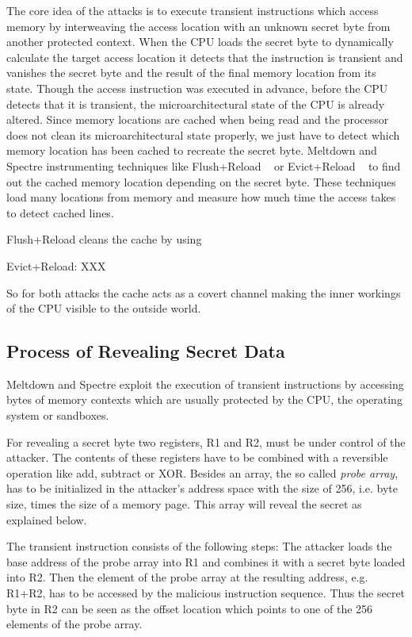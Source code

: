 \documentclass[a4paper,oneside,openright] {scrreprt}
\begin{document}
The core idea of the attacks is to execute transient instructions 
which access memory by interweaving the access location with an unknown secret byte from another protected context. 
When the CPU loads the secret byte to dynamically calculate the target access location 
it detects that the instruction is transient and vanishes the secret byte and the result of the final memory location from its state. 
Though the access instruction was executed in advance, before the CPU detects that it is transient, the microarchitectural state
 of the CPU is already altered.
 Since memory locations are cached when being read and the processor does not clean its microarchitectural state properly,
 we just have to detect which memory location has been cached to recreate the secret byte.
 Meltdown and Spectre instrumenting techniques like Flush+Reload ~\cite{yarom2014flush} 
 or Evict+Reload ~\cite{gruss2015cache} to find out the cached memory location depending on the secret byte.
These techniques load many locations from memory and measure how much time the access takes to detect cached lines.

Flush+Reload cleans the cache by using 

Evict+Reload: XXX

 So for both attacks the cache acts as a covert channel making the inner workings of the CPU visible to the outside world.

\subsection{Process of Revealing Secret Data}
\label{ch:intro:motivation:A}

Meltdown and Spectre exploit the execution of transient instructions by accessing bytes of memory contexts 
 which are usually protected by the CPU, the operating system or sandboxes. 

For revealing a secret byte two registers, R1 and R2, must be under control of the attacker. The contents of these registers have to be 
combined with a reversible operation like add, subtract or XOR. Besides an array, the so called \textit{probe array}, has to be 
initialized in the attacker's address space with the size of 256, i.e. byte size, times the size of a memory page. This array will 
reveal the secret as explained below.

The transient instruction consists of the following steps:
The attacker loads the base address of the probe array into R1 and combines it with a secret byte loaded into R2. 
Then the element of the probe array at the resulting address, e.g. R1+R2, has to be accessed by the malicious instruction sequence.
Thus the secret byte in R2 can be seen as the offset location which points to one of the 256 elements of the probe array.
\end{document}
